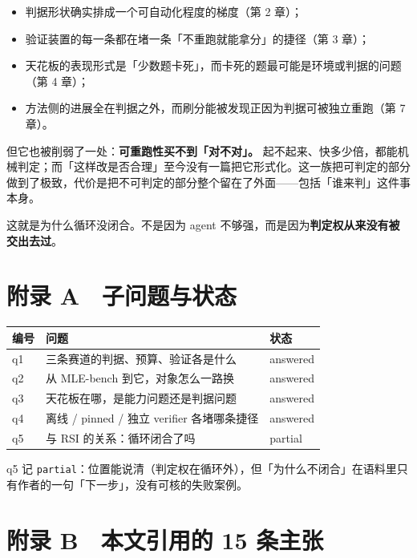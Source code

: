 \begin{itemize}
  \item 判据形状确实排成一个可自动化程度的梯度（第 2 章）；
  \item 验证装置的每一条都在堵一条「不重跑就能拿分」的捷径（第 3 章）；
  \item 天花板的表现形式是「少数题卡死」，而卡死的题最可能是环境或判据的问题（第 4 章）；
  \item 方法侧的进展全在判据之外，而刷分能被发现正因为判据可被独立重跑（第 7 章）。
\end{itemize}

但它也被削弱了一处：\textbf{可重跑性买不到「对不对」。} 起不起来、快多少倍，都能机械判定；而「这样改是否合理」至今没有一篇把它形式化。这一族把可判定的部分做到了极致，代价是把不可判定的部分整个留在了外面——包括「谁来判」这件事本身。


这就是为什么循环没闭合。不是因为 agent 不够强，而是因为\textbf{判定权从来没有被交出去过}。



\section{附录 A　子问题与状态}

\begin{table}[t]
\centering
\footnotesize
\setlength{\tabcolsep}{4pt}
\label{tab:6}
\begin{tabularx}{\textwidth}{lXl}
\toprule
编号 & 问题 & 状态 \\
\midrule
q1 & 三条赛道的判据、预算、验证各是什么 & answered \\
q2 & 从 MLE-bench 到它，对象怎么一路换 & answered \\
q3 & 天花板在哪，是能力问题还是判据问题 & answered \\
q4 & 离线 / pinned / 独立 verifier 各堵哪条捷径 & answered \\
q5 & 与 RSI 的关系：循环闭合了吗 & partial \\
\bottomrule
\end{tabularx}
\end{table}

q5 记 \texttt{partial}：位置能说清（判定权在循环外），但「为什么不闭合」在语料里只有作者的一句「下一步」，没有可核的失败案例。


\section{附录 B　本文引用的 15 条主张}


